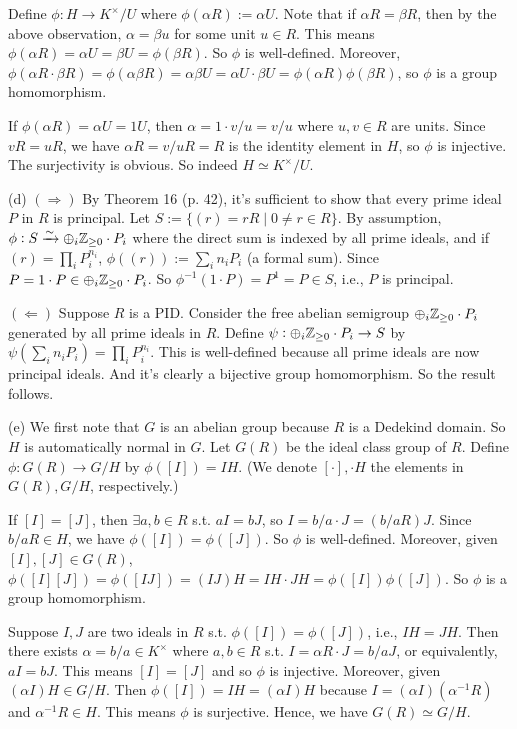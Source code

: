 \documentclass[../Marcus.tex]{subfiles}
\begin{document}
Define $\phi:H\to K^\times/U$ where $\phi(\alpha R):=\alpha U$. Note that if $\alpha R=\beta R$, then by the above observation, $\alpha=\beta u$ for some unit $u\in R$. This means $\phi(\alpha R)=\alpha U=\beta U=\phi(\beta R)$. So $\phi$ is well-defined. Moreover, $\phi(\alpha R\cdot \beta R)=\phi(\alpha\beta R)=\alpha\beta U=\alpha U\cdot \beta U=\phi(\alpha R)\phi(\beta R)$, so $\phi$ is a group homomorphism.

If $\phi(\alpha R)=\alpha U=1U$, then $\alpha=1\cdot v/u=v/u$ where $u,v\in R$ are units. Since $vR=uR$, we have $\alpha R=v/u R = R$ is the identity element in $H$, so $\phi$ is injective. The surjectivity is obvious. So indeed $H\simeq K^\times/U$.

(d) $(\Rightarrow)$ By Theorem 16 (p. 42), it's sufficient to show that every prime ideal $P$ in $R$ is principal. Let $S:=\{(r)=rR\mid 0\neq r\in R\}$. By assumption, $\phi:S\xrightarrow{\sim} \oplus_i \mathbb{Z}_{\geq0} \cdot P_i$ where the direct sum is indexed by all prime ideals, and if $(r)=\prod_i P_i^{n_i}$, $\phi((r)):=\sum_i n_iP_i$ (a formal sum). Since $P=1\cdot P\in \oplus_{i} \mathbb{Z}_{\geq0} \cdot P_i$. So $\phi^{-1}(1\cdot P)=P^1=P\in S$, i.e., $P$ is principal.

$(\Leftarrow)$ Suppose $R$ is a PID. Consider the free abelian semigroup $\oplus_{i} \mathbb{Z}_{\geq0}\cdot P_i$ generated by all prime ideals in $R$. Define $\psi:\oplus_{i} \mathbb{Z}_{\geq0}\cdot P_i \to S$ by $\psi(\sum_i n_iP_i)=\prod_i P_i^{n_i}$. This is well-defined because all prime ideals are now principal ideals. And it's clearly a bijective group homomorphism. So the result follows.

(e) We first note that $G$ is an abelian group because $R$ is a Dedekind domain. So $H$ is automatically normal in $G$. Let $G(R)$ be the ideal class group of $R$. Define $\phi:G(R)\to G/H$ by $\phi([I])=IH$. (We denote $[\cdot],\cdot H$ the elements in $G(R),G/H$, respectively.)

If $[I]=[J]$, then $\exists a,b\in R$ s.t. $aI=bJ$, so $I=b/a\cdot J = (b/aR)J$. Since $b/aR\in H$, we have $\phi([I])=\phi([J])$. So $\phi$ is well-defined. Moreover, given $[I],[J]\in G(R)$, $\phi([I][J])=\phi([IJ])=(IJ)H=IH\cdot JH=\phi([I])\phi([J])$. So $\phi$ is a group homomorphism.

Suppose $I,J$ are two ideals in $R$ s.t. $\phi([I])=\phi([J])$, i.e., $IH=JH$. Then there exists $\alpha=b/a\in K^\times$ where $a,b\in R$ s.t. $I=\alpha R\cdot J = b/a J$, or equivalently, $aI=bJ$. This means $[I]=[J]$ and so $\phi$ is injective. Moreover, given $(\alpha I)H\in G/H$. Then $\phi([I])=IH=(\alpha I)H$ because $I=(\alpha I)(\alpha^{-1}R)$ and $\alpha^{-1}R\in H$. This means $\phi$ is surjective. Hence, we have $G(R)\simeq G/H$.
\end{document}
